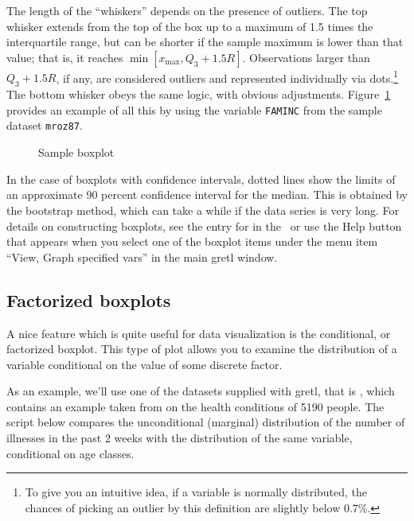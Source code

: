 The length of the ``whiskers'' depends on the presence of
outliers. The top whisker extends from the top of the box up to a
maximum of 1.5 times the interquartile range, but can be shorter if
the sample maximum is lower than that value; that is, it reaches
$\min[x_{\mathrm{max}}, Q_3 + 1.5 R]$. Observations larger than
$Q_3 + 1.5 R$, if any, are considered outliers and represented
individually via dots.\footnote{To give you an intuitive idea, if a
  variable is normally distributed, the chances of picking an outlier
  by this definition are slightly below 0.7\%.} The bottom whisker
obeys the same logic, with obvious adjustments.
Figure~\ref{fig-boxplot} provides an example of all this by using the
variable \texttt{FAMINC} from the sample dataset \texttt{mroz87}.

\begin{figure}[htbp]
  \begin{flushleft}
    \hspace{1cm}
  
  \end{flushleft}
  \caption{Sample boxplot}
  \label{fig-boxplot}
\end{figure}

In the case of boxplots with confidence intervals, dotted lines show
the limits of an approximate 90 percent confidence interval for the
median.  This is obtained by the bootstrap method, which can take a
while if the data series is very long. For details on constructing
boxplots, see the entry for  in the \GCR\, or use the
\textsf{Help} button that appears when you select one of the boxplot
items under the menu item ``View, Graph specified vars'' in the main
gretl window.

\subsection{Factorized boxplots}

A nice feature which is quite useful for data visualization is the
conditional, or factorized boxplot.  This type of plot allows you to
examine the distribution of a variable conditional on the value of
some discrete factor.

As an example, we'll use one of the datasets supplied with
gretl, that is , which contains an example taken from
\cite{cameron-trivedi13} on the health conditions of 5190 people. The
script below compares the unconditional (marginal) distribution of the
number of illnesses in the past 2 weeks with the distribution of the
same variable, conditional on age classes.

